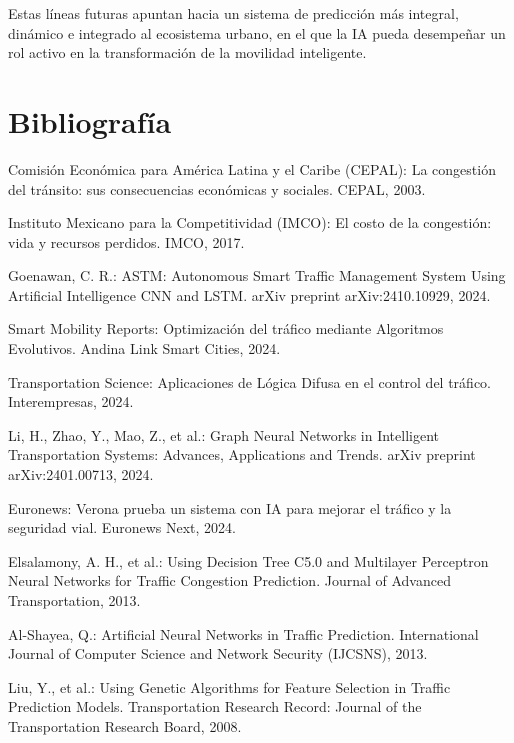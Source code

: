 \documentclass{svproc} %
\begin{document}
Estas líneas futuras apuntan hacia un sistema de predicción más integral, dinámico e integrado al ecosistema urbano, en el que la IA pueda desempeñar un rol activo en la transformación de la movilidad inteligente.

\section{Bibliografía}
\begin{thebibliography}{99}

     Comisión Económica para América Latina y el Caribe (CEPAL): La congestión del tránsito: sus consecuencias económicas y sociales. CEPAL, 2003.

     Instituto Mexicano para la Competitividad (IMCO): El costo de la congestión: vida y recursos perdidos. IMCO, 2017.

     Goenawan, C. R.: ASTM: Autonomous Smart Traffic Management System Using Artificial Intelligence CNN and LSTM. arXiv preprint arXiv:2410.10929, 2024.
    
     Smart Mobility Reports: Optimización del tráfico mediante Algoritmos Evolutivos. Andina Link Smart Cities, 2024.
    
     Transportation Science: Aplicaciones de Lógica Difusa en el control del tráfico. Interempresas, 2024.
  
     Li, H., Zhao, Y., Mao, Z., et al.: Graph Neural Networks in Intelligent Transportation Systems: Advances, Applications and Trends. arXiv preprint arXiv:2401.00713, 2024.

     Euronews: Verona prueba un sistema con IA para mejorar el tráfico y la seguridad vial. Euronews Next, 2024.
  
     Elsalamony, A. H., et al.: Using Decision Tree C5.0 and Multilayer Perceptron Neural Networks for Traffic Congestion Prediction. Journal of Advanced Transportation, 2013.
    
     Al-Shayea, Q.: Artificial Neural Networks in Traffic Prediction. International Journal of Computer Science and Network Security (IJCSNS), 2013.
    
     Liu, Y., et al.: Using Genetic Algorithms for Feature Selection in Traffic Prediction Models. Transportation Research Record: Journal of the Transportation Research Board, 2008.
    

\end{thebibliography}
\end{document}
